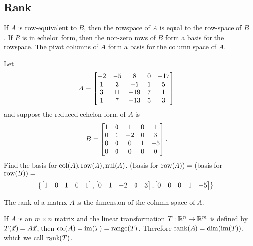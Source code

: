 \documentclass[10pt,a4paper]{article}
\begin{document}
\subsection{Rank}
\begin{recall}[Theorem]
	If $A$ is row-equivalent to $B$, then the rowspace of $A$ is equal to the row-space of $B$. If $B$ is in echelon form, then the non-zero rows of $B$ form a basis for the rowspace. The pivot columns of $A$ form a basis for the column space of $A$.
\end{recall}
\begin{example}
	Let $$ A = \begin{bmatrix}-2 & -5 & 8 & 0 & -17 \\ 1 & 3 & -5 & 1 & 5 \\ 3 & 11 & -19 & 7 & 1 \\ 1 & 7 & -13 & 5 & 3\end{bmatrix}$$
	and suppose the reduced echelon form of $A$ is $$ B = \begin{bmatrix}1 & 0 & 1 & 0 & 1 \\ 0 & 1 & -2 & 0 & 3 \\ 0 & 0 & 0 & 1 & -5 \\ 0 & 0 & 0 & 0 & 0\end{bmatrix}.$$
	Find the basis for $\text{col}(A),\text{row}(A),\text{nul}(A)$.
	(Basis for $\text{row}(A)) = $ (basis for $\text{row}(B)) = $ $$ \{\begin{bmatrix}1&0&1&0&1\end{bmatrix},\begin{bmatrix}0&1&-2&0&3\end{bmatrix},\begin{bmatrix}0&0&0&1&-5\end{bmatrix}\}.$$	
	\begin{recall}
		The rank of a matrix $A$ is the dimension of the column space of $A$.
	\end{recall}
	If $A$ is an $m\times n$ matrix and the linear transformation $T:\mathbb{R}^n \rightarrow \mathbb{R}^m$ is defined by $T(\vec{x}) = A\vec{x}$, then $\text{col}(A) = \text{im}(T) = \text{range}(T)$. Therefore $\text{rank}(A) = \dim(\text{im}(T))$, which we call $\text{rank}(T)$.
\end{example}
\end{document}
